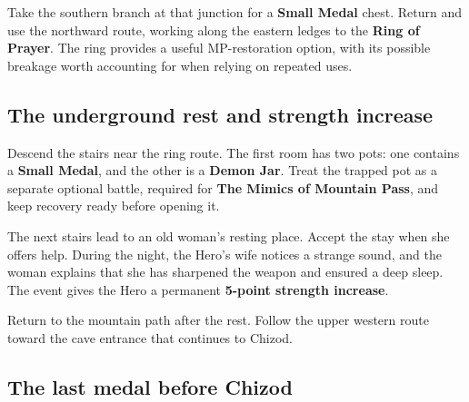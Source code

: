 
Take the southern branch at that junction for a
\textbf{Small Medal} chest. Return and use the northward route,
working along the eastern ledges to the \textbf{Ring of Prayer}.
The ring provides a useful MP-restoration option, with its possible
breakage worth accounting for when relying on repeated uses.

\subsection*{The underground rest and strength increase}


Descend the stairs near the ring route. The first room has two pots:
one contains a \textbf{Small Medal}, and the other is a
\textbf{Demon Jar}. Treat the trapped pot as a separate optional
battle, required for \textbf{The Mimics of Mountain Pass}, and keep
recovery ready before opening it.

The next stairs lead to an old woman's resting place. Accept the
stay when she offers help. During the night, the Hero's wife notices
a strange sound, and the woman explains that she has sharpened the
weapon and ensured a deep sleep. The event gives the Hero a permanent
\textbf{5-point strength increase}.


Return to the mountain path after the rest. Follow the upper western
route toward the cave entrance that continues to Chizod.

\subsection*{The last medal before Chizod}

